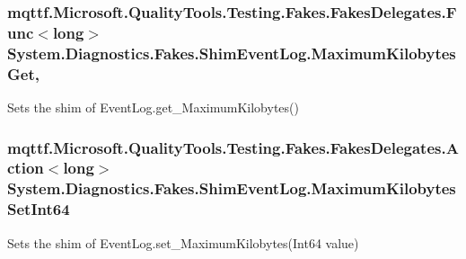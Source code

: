 \hypertarget{class_system_1_1_diagnostics_1_1_fakes_1_1_shim_event_log_aa60e418738c2bc576b9188909e648984}{
\subsubsection[{Maximum\-Kilobytes\-Get}]{\setlength{\rightskip}{0pt plus 5cm}mqttf.\-Microsoft.\-Quality\-Tools.\-Testing.\-Fakes.\-Fakes\-Delegates.\-Func$<$long$>$ System.\-Diagnostics.\-Fakes.\-Shim\-Event\-Log.\-Maximum\-Kilobytes\-Get\hspace{0.3cm}{\ttfamily [get]}, {\ttfamily [set]}}}\label{class_system_1_1_diagnostics_1_1_fakes_1_1_shim_event_log_aa60e418738c2bc576b9188909e648984}


Sets the shim of Event\-Log.\-get\-\_\-\-Maximum\-Kilobytes()

\hypertarget{class_system_1_1_diagnostics_1_1_fakes_1_1_shim_event_log_a82a8c8b30a956a11a666b9abdc801879}{
\subsubsection[{Maximum\-Kilobytes\-Set\-Int64}]{\setlength{\rightskip}{0pt plus 5cm}mqttf.\-Microsoft.\-Quality\-Tools.\-Testing.\-Fakes.\-Fakes\-Delegates.\-Action$<$long$>$ System.\-Diagnostics.\-Fakes.\-Shim\-Event\-Log.\-Maximum\-Kilobytes\-Set\-Int64\hspace{0.3cm}{\ttfamily [set]}}}\label{class_system_1_1_diagnostics_1_1_fakes_1_1_shim_event_log_a82a8c8b30a956a11a666b9abdc801879}


Sets the shim of Event\-Log.\-set\-\_\-\-Maximum\-Kilobytes(\-Int64 value)

